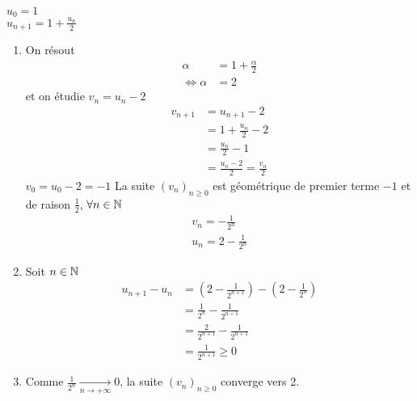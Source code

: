 \begin{exercice}~
    \\
    $u_0 = 1$ \\
    $u_{n+1} = 1 + \frac{u_n}{2}$
    \begin{enumerate}
        \item On résout 
            \begin{align*}
                \alpha &= 1 + \frac{\alpha}{2} \\
                \iff \alpha &= 2
            \end{align*}
        et on étudie $v_n = u_n - 2$
        \begin{align*}
            v_{n+1} &= u_{n+1} - 2 \\
                    &= 1 + \frac{u_n}{2} - 2 \\
                    &= \frac{u_n}{2} - 1 \\
                    &= \frac{u_n - 2}{2} = \frac{v_n}{2}
        \end{align*}
        $v_0 = u_0 - 2 = - 1$
        La suite $(v_n)_{n \geq 0}$ est géométrique de premier terme $-1$ et de raison $\frac{1}{2}$, $\forall n \in \mathbb{N}$
        \begin{align*}
            v_n = -\frac{1}{2^n} \\
            u_n = 2 - \frac{1}{2^n}
        \end{align*}
    \item 
        Soit $n \in \mathbb{N}$
        \begin{align*}
            u_{n+1} - u_n &= \left( 2 - \frac{1}{2^{n+1}} \right) - \left( 2 - \frac{1}{2^n} \right) \\
                          &= \frac{1}{2^n} - \frac{1}{2^{n+1}} \\
                          &= \frac{2}{2^{n+1}} - \frac{1}{2^{n+1}} \\
                          &= \frac{1}{2^{n+1}} \geq 0
        \end{align*}
        \item 
            Comme $\frac{1}{2^n} \xrightarrow[n \to +\infty]{} 0$, la suite $(v_n)_{n \geq 0}$ converge vers 2.
    \end{enumerate}
\end{exercice}

